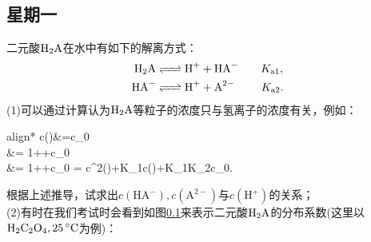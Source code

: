 \documentclass[UTF8,a4paper,11 pt]{ctexart}%
\begin{document}
	\subsection{星期一}\label{41}\noindent%
	二元酸$ \ce{H_2A} $在水中有如下的解离方式：
	\begin{align*}
		\ce{H_2A &<=> H^+ + HA-}\qquad K_{\mathrm{a}1},
		\\\ce{HA- &<=> H^+ + A^{2-}}\qquad\:\, K_{\mathrm{a}2}.
	\end{align*}(1)可以通过计算认为$ \ce{H_2A} $等粒子的浓度只与氢离子的浓度有关，例如：\begin{empheq}[box = \fbox]{align*}
		c()&=c_0
		\\&=
		{1++}c_0
		\\&=
		{1++}c_0
		=
		{c^2()+K_{1}c()+K_{1}K_{2}}c_0.
	\end{empheq}
	根据上述推导，试求出$ c(\mathrm{HA^-}),c(\mathrm{A^{2-}}) $与$  c(\mathrm{H^+})$的关系；
	\\(2)有时在我们考试时会看到如图\ref{41}\:来表示二元酸$ \ce{H_2A} $的分布系数(这里以$ \ce{H2C2O4} ,\SI{25}{\degreeCelsius}$为例)：
\end{document}
